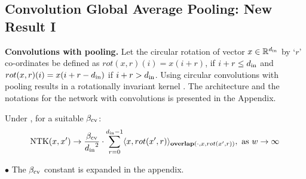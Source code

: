 \subsection{Convolution  Global Average Pooling: New Result I}
\textbf{Convolutions with pooling.} Let the circular rotation of vector $x\in\mathbb{R}^{d_{\text{in}}}$ by `$r$' co-ordinates be defined as $rot(x,r)(i)=x(i+ r)$, if $i+r \leq d_{\text{in}}$ and $rot(x,r)(i)=x(i+ r-d_{\text{in}})$ if $i+r > d_{\text{in}}$. Using circular convolutions with pooling results in a rotationally invariant kernel . The architecture and the notations for the network with convolutions is presented in the Appendix.

\begin{theorem}\label{th:conv} Under , for  a suitable $\beta_{\text{cv}}$:
\begin{align*}
\text{NTK}(x,x')\rightarrow  \frac{\beta_{\text{cv}}}{{d_{\text{in}}}^2} \cdot \sum_{r=0}^{d_{\text{in}}-1} \langle x,rot(x',r)\rangle_{\textbf{overlap}(\cdot, x,rot(x',r))},\,\, \text{as}\,\,  w\rightarrow\infty\,
\end{align*}
\end{theorem}

$\bullet$ The $\beta_{\text{cv}}$ constant is expanded in the appendix.

